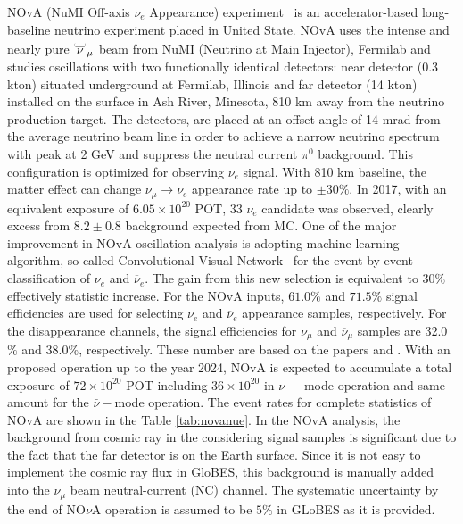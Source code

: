 \documentclass[a4 paper,12pt]{report}%
\newcommand\brabar{\raisebox{-4.0pt}{\scalebox{.2}{
\textbf{(}}}\raisebox{-4.0pt}{{\_}}\raisebox{-4.0pt}{\scalebox{.2}{\textbf{)
}}}}
\begin{document}
NOvA (NuMI Off-axis $\nu_e$ Appearance) experiment~\cite{Ayres:2004js} is an accelerator-based long-baseline neutrino experiment placed in United State. NOvA uses the intense and nearly pure $\overset{\brabar}{\nu}_{\mu}$ beam from NuMI (Neutrino at Main Injector), Fermilab  and studies oscillations with two functionally identical detectors: near detector (0.3 kton) situated underground at Fermilab, Illinois and far detector (14 kton) installed on the surface in Ash River, Minesota, 810 km away from the neutrino production target. The detectors, are placed at an offset angle of 14 mrad from the average neutrino beam line in order to achieve a narrow neutrino spectrum with peak at 2 GeV and suppress the neutral current $\pi^0$ background. This configuration is optimized for observing $\nu_e$ signal. With 810 km baseline, the matter effect can change $\nu_{\mu}\rightarrow \nu_e$ appearance rate up to $\pm 30\%$. In 2017, with an equivalent exposure of $6.05\times 10^{20}$ POT, 33 $\nu_e$ candidate was observed, clearly excess from $8.2\pm 0.8$ background expected from MC. One of the major improvement in NOvA oscillation analysis is adopting machine learning algorithm, so-called Convolutional Visual Network~\cite{Aurisano:2016jvx} for the event-by-event classification of $\nu_e$ and $\overline{\nu}_e$. The gain from this new selection is equivalent to 30$\%$ effectively statistic increase. For the NOvA inputs, $61.0\%$ and $71.5\%$ signal efficiencies are used for selecting $\nu_e$ and $\overline{\nu}_e$ appearance samples, respectively. For the disappearance channels, the signal efficiencies for $\nu_{\mu}$ and $\overline{\nu}_{\mu}$ samples are  32.0$\%$ and 38.0$\%$, respectively. These number are based on the papers \cite{NOvA:2018gge} and \cite{sanchez_mayly_2018_1286758}. With an proposed operation up to the year 2024, NOvA is expected to accumulate a total exposure of $72 \times 10^{20}$ POT including $36\times 10^{20}$ in $\nu-$ mode operation and same amount for the $\bar{\nu}-$mode operation. The event rates for complete statistics of NOvA are shown in the Table \ref{tab:novanue}. In the NOvA analysis, the background from cosmic ray in the considering signal samples is significant due to the fact that the far detector is on the Earth surface. Since it is not easy to implement the cosmic ray flux in GloBES, this background is manually added into the $\nu_{\mu}$ beam neutral-current (NC) channel. The systematic uncertainty by the end of NO$\nu$A operation is assumed to be $5\%$ in GLoBES as it is provided. 
\end{document}
